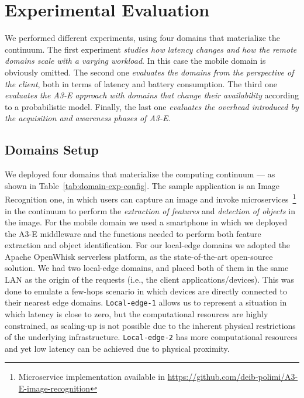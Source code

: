 \section{Experimental Evaluation}\label{sec:evaluation}

We performed different experiments, using four domains that materialize the continuum. The first experiment \emph{studies how latency changes and how the remote domains scale with a varying workload}. In this case the mobile domain is obviously omitted. The second one \emph{evaluates the domains from the perspective of the client}, both in terms of latency and battery consumption. The third one \emph{evaluates the A3-E approach with domains that change their availability} according to a probabilistic model.
Finally, the last one \emph{evaluates the overhead introduced by the acquisition and awareness phases of A3-E}.

\subsection{Domains Setup}


We deployed four domains that materialize the computing continuum --- as shown in Table~\ref{tab:domain-exp-config}. The sample application is an Image Recognition one, in which users can capture an image and invoke microservices~\footnote{Microservice implementation available in \url{https://github.com/deib-polimi/A3-E-image-recognition}} in the continuum to perform the \textit{extraction of features} and \textit{detection of objects} in the image. For the mobile domain we used a smartphone in which we deployed the A3-E middleware and the functions needed to perform both feature extraction and object identification. For our local-edge domains we adopted the Apache OpenWhisk serverless platform, as the state-of-the-art open-source solution. We had two local-edge domains, and placed both of them in the same LAN as the origin of the requests (i.e., the client applications/devices). This was done to emulate a few-hops scenario in which devices are directly connected to their nearest edge domains. \texttt{Local-edge-1} allows us to represent a situation in which latency is close to zero, but the computational resources are highly constrained, as scaling-up is not possible due to the inherent physical restrictions of the underlying infrastructure. \texttt{Local-edge-2} has more computational resources and yet low latency can be achieved due to physical proximity.

